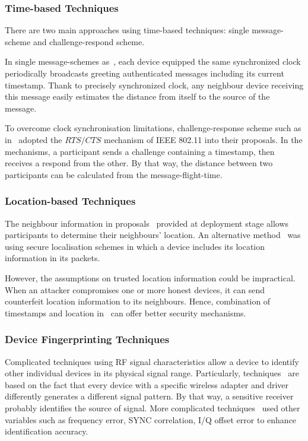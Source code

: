 \subsubsection*{Time-based Techniques}

There are two main approaches using time-based techniques: single message-scheme and challenge-respond scheme. 

In single message-schemes as~\cite{Brands:1994aa,Hancke:2005:RDB:1128018.1128472,Capkun:2003:SST:986858.986862,Yih-ChunHu2002}, each device equipped the same synchronized clock periodically broadcasts greeting authenticated messages including its current timestamp. Thank to precisely synchronized clock, any neighbour device receiving this message easily estimates the distance from itself to the source of the message. 

To overcome clock synchronisation limitations, challenge-response scheme such as in~\cite{4110280} adopted the $RTS/CTS$ mechanism of IEEE 802.11 into their proposals. In the mechanisms, a participant sends a challenge containing a timestamp, then receives a respond from the other. By that way, the distance between two participants can be calculated from the message-flight-time. 

\subsubsection*{Location-based Techniques}

The neighbour information in proposals~\cite{Yih-ChunHu2002,LOUKASLAZOS,LoukasLazos2005, 4146955} provided at deployment stage allows participants to determine their neighbours' location. An alternative method~\cite{1589106} was using secure localisation schemes in which a device includes its location information in its packets. 

However, the assumptions on trusted location information could be impractical. When an attacker compromises one or more honest devices, it can send counterfeit location information to its neighbours. Hence, combination of timestamps and location in~\cite{Shokri:2009:PSN:1514274.1514302} can offer better security mechanisms.

\subsubsection*{Device Fingerprinting Techniques}

Complicated techniques using RF signal characteristics allow a device to identify other individual devices in its physical signal range. Particularly, techniques~\cite{Kasper, OktayUreten2007, VladimirBrik} are based on the fact that every device with a specific wireless adapter and driver differently generates a different signal pattern. By that way, a sensitive receiver probably identifies the source of signal. More complicated techniques~\cite{SumanJana, 5211943, 819017} used other variables such as frequency error, SYNC correlation, I/Q offset error to enhance identification accuracy. 

